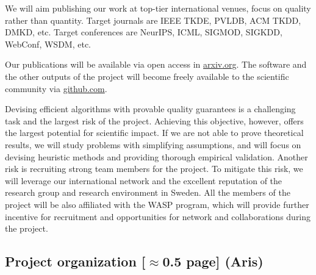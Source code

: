 \documentclass[a4paper,11pt]{article}
\begin{document}
We will aim publishing our work at top-tier international venues, 
focus on quality rather than quantity.
% 
Target journals 
are IEEE TKDE, PVLDB, ACM TKDD,  DMKD, etc. 
Target conferences are NeurIPS, ICML, SIGMOD, SIGKDD, WebConf, WSDM, etc.

Our publications will be available via open access in {\small\url{arxiv.org}}. 
The software and the other outputs of the project 
will become freely available to the scientific community via {\small\url{github.com}}.

Devising efficient algorithms with provable quality guarantees is a challenging task
and the largest risk of the project. 
Achieving this objective, however, offers the largest potential for scientific impact.
If we are not able to prove theoretical results, 
we will study problems with simplifying assumptions, and 
will focus on devising heuristic methods and providing thorough empirical validation.
Another risk is recruiting strong team members for the project. 
To mitigate this risk, we will leverage our international network
and the excellent reputation of the research group and research environment in Sweden. 
All the members of the project will be also affiliated with the WASP program, 
which will provide further incentive for recruitment and opportunities 
for network and collaborations during the project.


\subsection{Project organization {\color{orange}[$\approx$0.5 page]} {\color{teal}(Aris)}}

\end{document}
